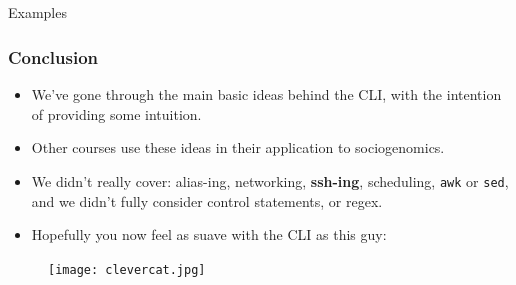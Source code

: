 \documentclass[10pt]{beamer}
\begin{document}
\subsection{}
\begin{frame}[fragile]{Examples}
\frametitle{Conclusion}
\begin{itemize}
\item We've gone through the main basic ideas behind the CLI, with the intention of providing some intuition.\vspace{0.05in}\pause
\item Other courses use these ideas in their application to sociogenomics.\vspace{0.05in}\pause
\item We didn't really cover: alias-ing, networking, \textbf{ssh-ing}, scheduling, \texttt{awk} or \texttt{sed}, and we didn't fully consider control statements, or regex.\vspace{0.05in} \pause
\item Hopefully you now feel as suave with the CLI as this guy:
\end{itemize}
\begin{figure}[!b]
\texttt{[image: clevercat.jpg]}
\end{figure}
\end{frame}
\end{document}

